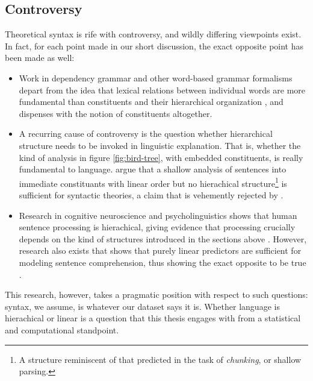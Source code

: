 \subsection{Controversy}
Theoretical syntax is rife with controversy, and wildly differing viewpoints exist. In fact, for each point made in our short discussion, the exact opposite point has been made as well:

\begin{itemize}

  \item Work in dependency grammar and other word-based grammar formalisms depart from the idea that lexical relations between individual words are more fundamental than constituents and their hierarchical organization \citep{tesniere1959elements,nivre2005dependency,hudson2010introduction}, and dispenses with the notion of constituents altogether.

  \item A recurring cause of controversy is the question whether hierarchical structure needs to be invoked in linguistic explanation. That is, whether the kind of analysis in figure \ref{fig:bird-tree}, with embedded constituents, is really fundamental to language. \citet{frank2012hierarchical} argue that a shallow analysis of sentences into immediate constituants with linear order but no hierachical structure\footnote{A structure reminiscent of that predicted in the task of \textit{chunking}, or shallow parsing.} is sufficient for syntactic theories, a claim that is vehemently rejected by \citet{everaert2015structures}.

  \item Research in cognitive neuroscience and psycholinguistics shows that human sentence processing is hierachical, giving evidence that processing crucially depends on the kind of structures introduced in the sections above \citep{hale2001earley,levy2008expectation,brennan2016abstract}. However, research also exists that shows that purely linear predictors are sufficient for modeling sentence comprehension, thus showing the exact opposite to be true \citep{conway2008neurocognitive,gillespie2011hierarchy,christiansen2012similar,gillespie2013against,frank2012hierarchical}.

\end{itemize}

This research, however, takes a pragmatic position with respect to such questions: syntax, we assume, is whatever our dataset says it is. Whether language is hierachical or linear is a question that this thesis engages with from a statistical and computational standpoint.

